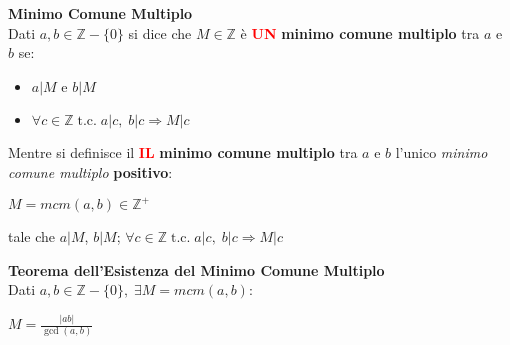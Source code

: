 \begin{flushleft}
    \textbf{Minimo Comune Multiplo} \\
    Dati $a, b \in \mathbb{Z} - \{0\}$ si dice che $M \in \mathbb{Z}$ è \textcolor{red}{\textbf{UN}} \textbf{minimo comune multiplo} tra $a$ e $b$ se:
    \begin{itemize}[nosep]
        \item $a|M$ e $b|M$
        \item $\forall c \in \mathbb{Z} \; \text{t.c.} \; a|c, \; b|c \Rightarrow M|c$
    \end{itemize}
    Mentre si definisce il \textcolor{red}{\textbf{IL}} \textbf{minimo comune multiplo} tra $a$ e $b$ l'unico \textit{minimo comune multiplo} \textbf{positivo}:

    {\centering
        $M = mcm(a,b) \in \mathbb{Z}^+$
    \par}
    tale che $a|M$, $b|M$; $\forall c \in \mathbb{Z} \; \text{t.c.} \; a|c, \; b|c \Rightarrow M|c$
\end{flushleft}

\newpage
\begin{flushleft}
    \textbf{Teorema dell'Esistenza del Minimo Comune Multiplo} \\
    Dati $a, b \in \mathbb{Z} - \{0\}, \; \exists M = mcm(a, b)$:
    
    {\centering
        $M = \frac{|ab|}{\gcd (a, b)}$
    \par}
\end{flushleft}

